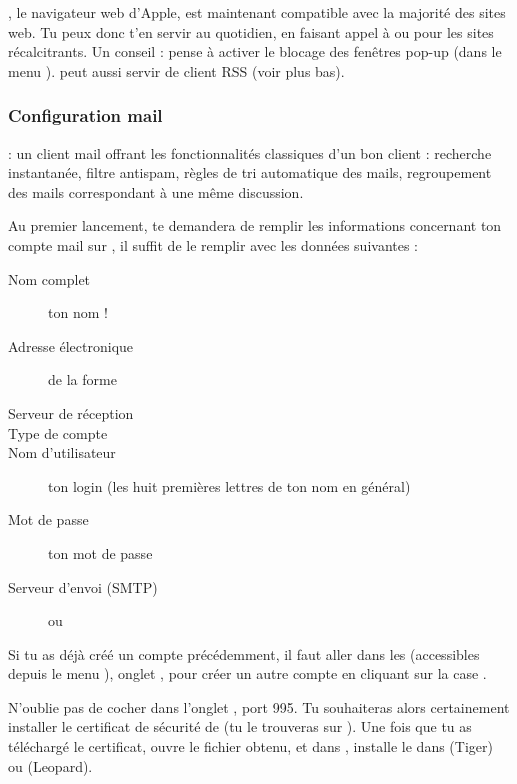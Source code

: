  , le navigateur web d'Apple, est maintenant compatible avec la majorité des sites web. Tu peux donc t'en servir au quotidien, en faisant appel à  ou  pour les sites récalcitrants. Un conseil : pense à activer le blocage des fenêtres pop-up (dans le menu ).  peut aussi servir de client RSS (voir plus bas).\\

\subsubsection{Configuration mail}

  : un client mail offrant les fonctionnalités classiques d'un bon client : recherche instantanée, filtre antispam, règles de tri automatique des mails, regroupement des mails correspondant à une même discussion.

Au premier lancement,  te demandera de remplir les informations concernant ton compte mail sur , il suffit de le remplir avec les données suivantes :

\begin{description}
  \item[Nom complet] ton nom !
  \item[Adresse électronique] de la forme 
  \item[Serveur de réception] 
  \item[Type de compte] 
  \item[Nom d'utilisateur] ton login  (les huit premières lettres de ton nom en général)
  \item[Mot de passe] ton mot de passe 
  \item[Serveur d'envoi (SMTP)]  ou 
\end{description}

Si tu as déjà créé un compte précédemment, il faut aller dans les  (accessibles depuis le menu ), onglet , pour créer un autre compte en cliquant sur la case \menu{+}.

N'oublie pas de cocher  dans l'onglet , port 995. Tu souhaiteras alors certainement installer le certificat de sécurité de  (tu le trouveras sur ). Une fois que tu as téléchargé le certificat, ouvre le fichier  obtenu, et dans , installe le dans  (Tiger) ou  (Leopard).


